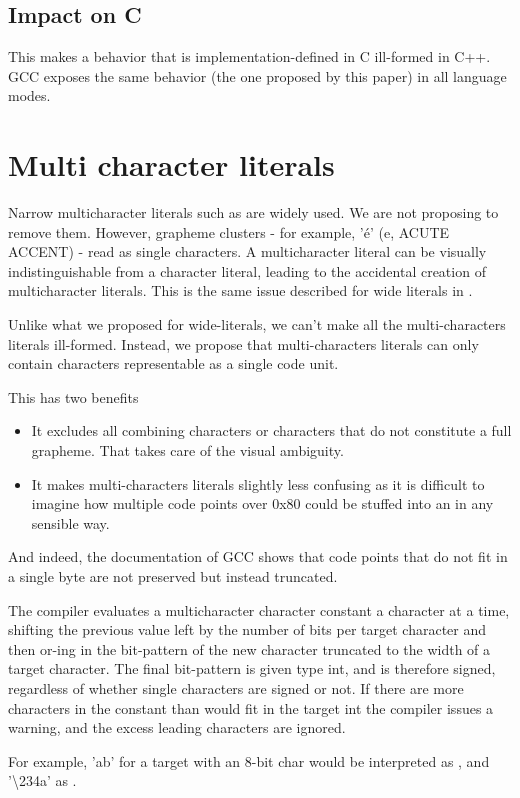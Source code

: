 \documentclass{wg21}
\begin{document}
\subsection{Impact on C}

This makes a behavior that is implementation-defined in C ill-formed in C++.
GCC exposes the same behavior (the one proposed by this paper) in all language modes.

\section{Multi character literals}

Narrow multicharacter literals such as  are widely used. We are not proposing to remove them.
However, grapheme clusters - for example, 'é' (e, ACUTE ACCENT) - read as single characters.
A multicharacter literal can be visually indistinguishable from a character literal, leading to the accidental creation of multicharacter literals.
This is the same issue described for wide literals in .

Unlike what we proposed for wide-literals, we can't make all the multi-characters literals ill-formed.
Instead, we propose that multi-characters literals can only contain characters representable as a single code unit.

This has two benefits
\begin{itemize}
\item It excludes all combining characters or characters that do not constitute a full grapheme. That takes care of the visual ambiguity.
\item It makes multi-characters literals slightly less confusing as it is difficult to imagine how multiple code points over 0x80 could be stuffed into an  in any sensible way.
\end{itemize}
And indeed, the documentation of GCC shows that code points that do not fit in a single byte are not preserved but instead truncated.
\begin{quoteblock}
The compiler evaluates a multicharacter character constant a character at a time, shifting the previous value left by the number of bits per target character and then or-ing in the bit-pattern of the new character truncated to the width of a target character. The final bit-pattern is given type int, and is therefore signed, regardless of whether single characters are signed or not. If there are more characters in the constant than would fit in the target int the compiler issues a warning, and the excess leading characters are ignored.

For example, 'ab' for a target with an 8-bit char would be interpreted as , and '\textbackslash 234a' as .
\end{quoteblock}
\end{document}
